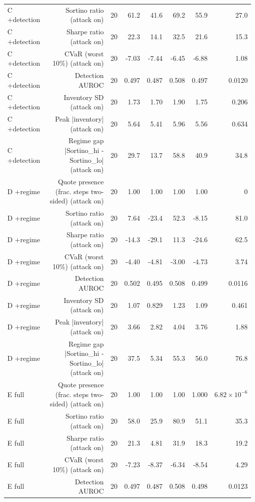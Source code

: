\begin{table}[htbp]
\begin{tabular}{lrrrrrrr}
    C  +detection & Sortino ratio (attack on) & 20 & 61.2 & 41.6 & 69.2 & 55.9 & 27.0 \\
    C  +detection & Sharpe ratio (attack on) & 20 & 22.3 & 14.1 & 32.5 & 21.6 & 15.3 \\
    C  +detection & CVaR (worst 10\%) (attack on) & 20 & -7.03 & -7.44 & -6.45 & -6.88 & 1.08 \\
    C  +detection & Detection AUROC & 20 & 0.497 & 0.487 & 0.508 & 0.497 & 0.0120 \\
    C  +detection & Inventory SD (attack on) & 20 & 1.73 & 1.70 & 1.90 & 1.75 & 0.206 \\
    C  +detection & Peak |inventory| (attack on) & 20 & 5.64 & 5.41 & 5.96 & 5.56 & 0.634 \\
    C  +detection & Regime gap  |Sortino\_hi - Sortino\_lo| (attack on) & 20 & 29.7 & 13.7 & 58.8 & 40.9 & 34.8 \\
    D  +regime & Quote presence (frac. steps two-sided) (attack on) & 20 & 1.00 & 1.00 & 1.00 & 1.00 & 0 \\
    D  +regime & Sortino ratio (attack on) & 20 & 7.64 & -23.4 & 52.3 & -8.15 & 81.0 \\
    D  +regime & Sharpe ratio (attack on) & 20 & -14.3 & -29.1 & 11.3 & -24.6 & 62.5 \\
    D  +regime & CVaR (worst 10\%) (attack on) & 20 & -4.40 & -4.81 & -3.00 & -4.73 & 3.74 \\
    D  +regime & Detection AUROC & 20 & 0.502 & 0.495 & 0.508 & 0.499 & 0.0116 \\
    D  +regime & Inventory SD (attack on) & 20 & 1.07 & 0.829 & 1.23 & 1.09 & 0.461 \\
    D  +regime & Peak |inventory| (attack on) & 20 & 3.66 & 2.82 & 4.04 & 3.76 & 1.88 \\
    D  +regime & Regime gap  |Sortino\_hi - Sortino\_lo| (attack on) & 20 & 37.5 & 5.34 & 55.3 & 56.0 & 76.8 \\
    E  full & Quote presence (frac. steps two-sided) (attack on) & 20 & 1.00 & 1.00 & 1.00 & 1.000 & $6.82\times10^{-6}$ \\
    E  full & Sortino ratio (attack on) & 20 & 58.0 & 25.9 & 80.9 & 51.1 & 35.3 \\
    E  full & Sharpe ratio (attack on) & 20 & 21.3 & 4.81 & 31.9 & 18.3 & 19.2 \\
    E  full & CVaR (worst 10\%) (attack on) & 20 & -7.23 & -8.37 & -6.34 & -8.54 & 4.29 \\
    E  full & Detection AUROC & 20 & 0.497 & 0.487 & 0.508 & 0.498 & 0.0123 \\

\end{tabular}
\end{table}
